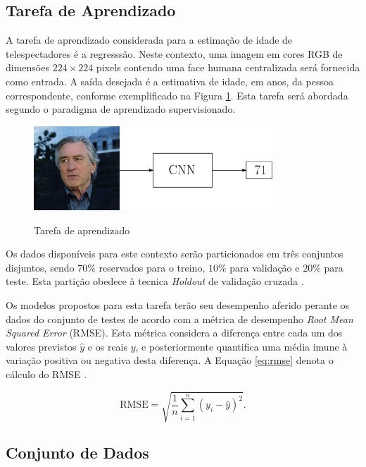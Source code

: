 
\subsection{Tarefa de Aprendizado}
A tarefa de aprendizado considerada para a estimação de idade de telespectadores é a regresssão. Neste contexto, uma imagem em cores RGB de dimensões $224 \times 224$ pixels contendo uma face humana centralizada será fornecida como entrada. A saída desejada é a estimativa de idade, em anos, da pessoa correspondente, conforme exemplificado na Figura \ref{fig:deniro_cnn}. Esta tarefa será abordada segundo o paradigma de aprendizado supervisionado.

\begin{figure}[h!]
  \centering
     \caption{Tarefa de aprendizado}
     \includegraphics[width=0.8\textwidth]{img/deniro_cnn}
     \label{fig:deniro_cnn}
\end{figure}

Os dados disponíveis para este contexto serão particionados em três conjuntos disjuntos, sendo $70\%$ reservados para o treino, $10\%$ para validação e $20\%$ para teste. Esta partição obedece à tecnica \emph{Holdout} de validação cruzada \cite{brink2016real}.

Os modelos propostos para esta tarefa terão seu desempenho aferido perante os dados do conjunto de testes de acordo com a métrica de desempenho \emph{Root Mean Squared Error} (RMSE). Esta métrica considera a diferença entre cada um dos valores previstos $\hat{y}$ e os reais $y$, e posteriormente quantifica uma média imune à variação positiva ou negativa desta diferença. A Equação \ref{eq:rmse} denota o cálculo do RMSE \cite{brink2016real}.

\begin{equation}\label{eq:rmse}
     \textrm{RMSE} = \sqrt{\frac{1}{n} \sum_{i=1}^n (y_i - \hat{y})^2}.
\end{equation}

\subsection{Conjunto de Dados}


